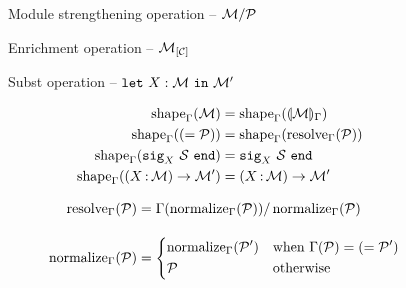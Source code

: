 \begin{figure}[tbp]
  
  \caption{Module strengthening operation -- $\mathcal M/\mathcal P$}
  \label{module:strengthen}
\end{figure}

\begin{figure}[tbp]
  
  \caption{Enrichment operation -- ${\mathcal M}_{\left[\mathcal C\right]}$}
  \label{module:enrich}
\end{figure}

\begin{figure}[tbp]
  
  \caption{Subst operation -- $\mathtt{let}\ X : \mathcal M\ \mathtt{in}\ \mathcal M'$}
  \label{module:subst}
\end{figure}

\begin{figure}[tbp]
  \vspace{-3mm}
  \caption{Lookup rules -- $\lookup{\E}{\ip} = \iM$}
  \label{module:lookup}

  \begin{subfigure}[t]{0.5\linewidth}
    \begin{align*}
      \operatorname{shape}_{\Gamma}(\mathcal M) &= \operatorname{shape}_{\Gamma}(\llparenthesis \mathcal M \rrparenthesis_{\Gamma})\\
      \operatorname{shape}_{\Gamma}((= \mathcal P)) &= \operatorname{shape}_{\Gamma}(\operatorname{resolve}_{\Gamma}(\mathcal P))\\
      \operatorname{shape}_{\Gamma}(\mathtt{sig}_{X}\ \mathcal S\ \mathtt{end}) &= \mathtt{sig}_{X}\ \mathcal S\ \mathtt{end}\\
      \operatorname{shape}_{\Gamma}((X \operatorname{:} \mathcal M) \to \mathcal M') &= (X \operatorname{:} \mathcal M) \to \mathcal M'
    \end{align*}
  \end{subfigure}
  \begin{subfigure}[t]{0.5\linewidth}
    \begin{align*}
      \operatorname{resolve}_{\Gamma}(\mathcal P)
      &= \Gamma(\operatorname{normalize}_{\Gamma}(\mathcal P))/\operatorname{normalize}_{\Gamma}(\mathcal P)
      \\[1em]
      \operatorname{normalize}_{\Gamma}(\mathcal P)
      &=
        \begin{dcases}
          \operatorname{normalize}_{\Gamma}(\mathcal P') & \text{when } \Gamma(\mathcal P) = (= \mathcal P') \\
          \mathcal P & \text{otherwise}
        \end{dcases}
    \end{align*}
  \end{subfigure}

\end{figure}



